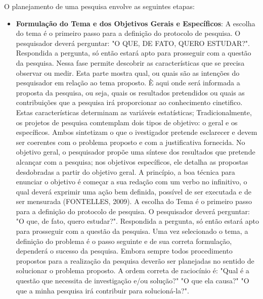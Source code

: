\newpage
O planejamento de uma pesquisa envolve as seguintes etapas:


 \begin{itemize}
   \item \textbf{Formulação do Tema e dos Objetivos Gerais e Específicos}: 
   A escolha do tema é o primeiro passo para a definição do protocolo de pesquisa. O pesquisador deverá perguntar: "O QUE, DE FATO, QUERO ESTUDAR?". Respondida a pergunta, só então estará apto para prosseguir com a questão da pesquisa. Nessa fase permite
descobrir as características que se precisa observar ou medir.
Esta parte mostra qual, ou quais são as intenções do pesquisador
em relação ao tema proposto. È aqui onde será informada a proposta
da pesquisa, ou seja, quais os resultados pretendidos ou quais as
contribuições que a pesquisa irá proporcionar ao conhecimento
cinetifico. Estas características determinam as variáveis
estatísticas; Tradicionalmente, os projetos de pesquisa comtemplam
dois tipos de objetivo: o geral e os específicos. Ambos sintetizam
o que o ivestigador pretende esclarecer e devem ser coerentes com
o problema proposto e com a justificativa fornecida. No objetivo
geral, o pesquisador propõe uma síntese dos resultados que
pretende alcançar com a pesquisa; nos objetivos específicos, ele
detalha as propostas desdobradas a partir do objetivo geral. A
princípio, a boa técnica para enunciar o objetivo é começar a sua
redação com um verbo no infinitivo, o qual deverá exprimir uma
ação bem definida, possível de ser executada e de ser mensurada
(FONTELLES, 2009). A escolha do Tema é o primeiro passo para a definição do protocolo de pesquisa. O pesquisador deverá perguntar: "O que, de fato, quero estudar?". Respondida a pergunta, só então estará apto para prosseguir com a questão da pesquisa. Uma vez selecionado o tema, a definição do problema é o passo seguinte e de sua correta formulação, dependerá o sucesso da pesquisa. Embora sempre todos procedimento propostos para a realização da pesquisa deverão ser planejadas no sentido de solucionar o problema proposto. A ordem correta de raciocínio é: "Qual é a questão que necessita de investigação e/ou solução?" 
"O que ela causa?" "O que a minha pesquisa irá contribuir para solucioná-la?".     




\end{itemize}
